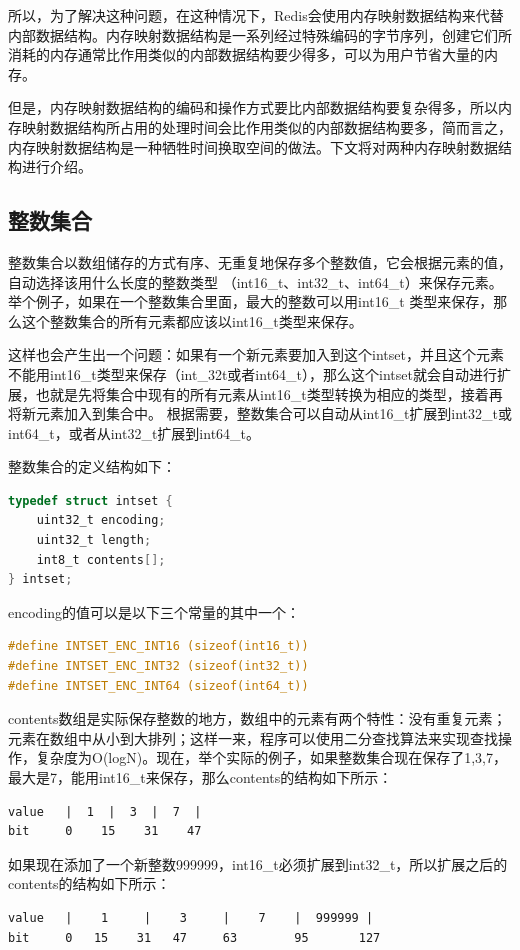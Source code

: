 \documentclass{zjutthesis}
\begin{document}
所以，为了解决这种问题，在这种情况下，Redis会使用内存映射数据结构来代替内部数据结构。内存映射数据结构是一系列经过特殊编码的字节序列，创建它们所消耗的内存通常比作用类似的内部数据结构要少得多，可以为用户节省大量的内存。

但是，内存映射数据结构的编码和操作方式要比内部数据结构要复杂得多，所以内存映射数据结构所占用的处理时间会比作用类似的内部数据结构要多，简而言之，内存映射数据结构是一种牺牲时间换取空间的做法。下文将对两种内存映射数据结构进行介绍。

\subsection{整数集合}
整数集合以数组储存的方式有序、无重复地保存多个整数值，它会根据元素的值，自动选择该用什么长度的整数类型
（int16\_t、int32\_t、int64\_t）来保存元素。
举个例子，如果在一个整数集合里面，最大的整数可以用int16\_t
类型来保存，那么这个整数集合的所有元素都应该以int16\_t类型来保存。

这样也会产生出一个问题：如果有一个新元素要加入到这个intset，并且这个元素不能用int16\_t类型来保存（int\_32t或者int64\_t），那么这个intset就会自动进行扩展，也就是先将集合中现有的所有元素从int16\_t类型转换为相应的类型，接着再将新元素加入到集合中。
根据需要，整数集合可以自动从int16\_t扩展到int32\_t或int64\_t，或者从int32\_t扩展到int64\_t。

整数集合的定义结构如下：
\begin{lstlisting}[language=C]
typedef struct intset {
    uint32_t encoding;
    uint32_t length;
    int8_t contents[];
} intset;
\end{lstlisting}
encoding的值可以是以下三个常量的其中一个：
\begin{lstlisting}[language=C]
#define INTSET_ENC_INT16 (sizeof(int16_t))
#define INTSET_ENC_INT32 (sizeof(int32_t))
#define INTSET_ENC_INT64 (sizeof(int64_t))
\end{lstlisting}
contents数组是实际保存整数的地方，数组中的元素有两个特性：没有重复元素；元素在数组中从小到大排列；这样一来，程序可以使用二分查找算法来实现查找操作，复杂度为O(logN)。现在，举个实际的例子，如果整数集合现在保存了{1,3,7}，最大是7，能用int16\_t来保存，那么contents的结构如下所示：

\begin{verbatim}
value   |  1  |  3  |  7  |
bit     0    15    31    47
\end{verbatim}
如果现在添加了一个新整数999999，int16\_t必须扩展到int32\_t，所以扩展之后的contents的结构如下所示：
\begin{verbatim}
value   |    1     |    3     |    7    |  999999 |
bit     0   15    31   47     63        95       127
\end{verbatim}
\end{document}
